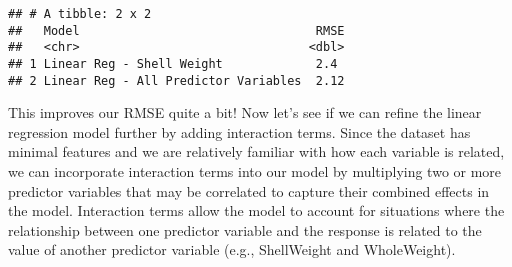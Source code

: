 \documentclass[
]{article}
\newenvironment{Shaded}{\begin{snugshade}}{\end{snugshade}}
\newcommand{\AttributeTok}[1]{\textcolor[rgb]{0.13,0.29,0.53}{#1}}
\newcommand{\DecValTok}[1]{\textcolor[rgb]{0.00,0.00,0.81}{#1}}
\newcommand{\FunctionTok}[1]{\textcolor[rgb]{0.13,0.29,0.53}{\textbf{#1}}}
\newcommand{\NormalTok}[1]{#1}
\newcommand{\OtherTok}[1]{\textcolor[rgb]{0.56,0.35,0.01}{#1}}
\newcommand{\SpecialCharTok}[1]{\textcolor[rgb]{0.81,0.36,0.00}{\textbf{#1}}}
\newcommand{\StringTok}[1]{\textcolor[rgb]{0.31,0.60,0.02}{#1}}
\begin{document}
\begin{Shaded}
\end{Shaded}

\begin{verbatim}
## # A tibble: 2 x 2
##   Model                                 RMSE
##   <chr>                                <dbl>
## 1 Linear Reg - Shell Weight             2.4 
## 2 Linear Reg - All Predictor Variables  2.12
\end{verbatim}

This improves our RMSE quite a bit! Now let's see if we can refine the
linear regression model further by adding interaction terms. Since the
dataset has minimal features and we are relatively familiar with how
each variable is related, we can incorporate interaction terms into our
model by multiplying two or more predictor variables that may be
correlated to capture their combined effects in the model. Interaction
terms allow the model to account for situations where the relationship
between one predictor variable and the response is related to the value
of another predictor variable (e.g., ShellWeight and WholeWeight).
\end{document}
